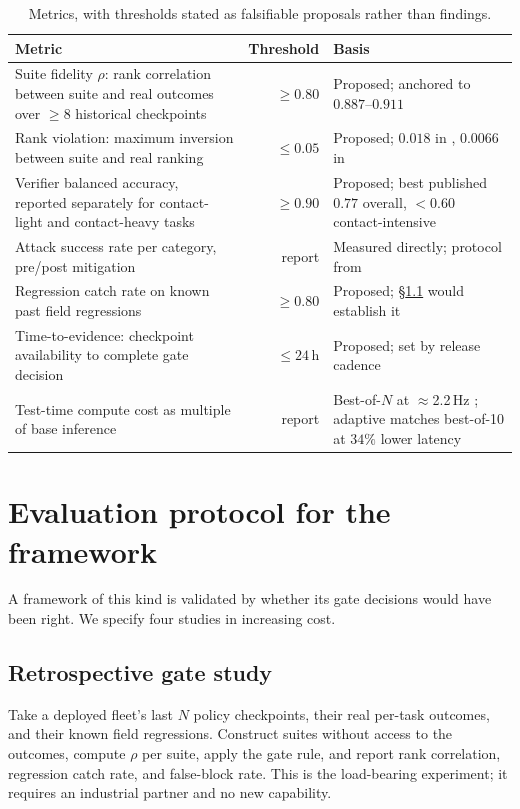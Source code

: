 \documentclass[11pt]{article}
\theoremstyle{definition}
\begin{document}
\begin{table}[t]
\small
\centering
\begin{tabularx}{\textwidth}{@{}X r X@{}}
\toprule
\textbf{Metric} & \textbf{Threshold} & \textbf{Basis} \\
\midrule
Suite fidelity $\rho$: rank correlation between suite and real outcomes over $\ge 8$ historical checkpoints & $\ge 0.80$ & Proposed; anchored to $0.887$--$0.911$ \citep{simfoundry,robosnap} \\
Rank violation: maximum inversion between suite and real ranking & $\le 0.05$ & Proposed; $0.018$ in \citep{simfoundry}, $0.0066$ in \citep{robosnap} \\
Verifier balanced accuracy, reported separately for contact-light and contact-heavy tasks & $\ge 0.90$ & Proposed; best published $0.77$ overall, $<0.60$ contact-intensive \citep{failbench} \\
Attack success rate per category, pre/post mitigation & report & Measured directly; protocol from \citep{paperhijack} \\
Regression catch rate on known past field regressions & $\ge 0.80$ & Proposed; \S\ref{sec:retro} would establish it \\
Time-to-evidence: checkpoint availability to complete gate decision & $\le 24$\,h & Proposed; set by release cadence \\
Test-time compute cost as multiple of base inference & report & Best-of-$N$ at $\approx$2.2\,Hz \citep{cover}; adaptive matches best-of-10 at $34\%$ lower latency \citep{elastic} \\
\bottomrule
\end{tabularx}
\caption{Metrics, with thresholds stated as falsifiable proposals rather than findings.}
\label{tab:metrics}
\end{table}

\section{Evaluation protocol for the framework}
\label{sec:protocol}

A framework of this kind is validated by whether its gate decisions would have been right. We
specify four studies in increasing cost.

\subsection{Retrospective gate study}
\label{sec:retro}
Take a deployed fleet's last $N$ policy checkpoints, their real per-task outcomes, and their
known field regressions. Construct suites without access to the outcomes, compute $\rho$ per
suite, apply the gate rule, and report rank correlation, regression catch rate, and
false-block rate. This is the load-bearing experiment; it requires an industrial partner and
no new capability.
\end{document}
